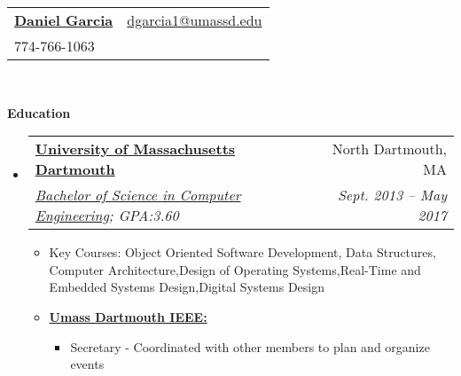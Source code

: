 \documentclass[letterpaper,11pt]{article}
\makeatletter
\newcommand{\resitem}[1]{\item #1 \vspace{-2pt}}
\newcommand{\resheading}[1]{{\large \colorbox{mygrey}{\begin{minipage}{\textwidth}{\textbf{#1 \vphantom{p\^{E}}}}\end{minipage}}}}
\newcommand{\ressubheading}[4]{
\begin{tabular*}{6.5in}{l@{\extracolsep{\fill}}r}
		\textbf{#1} & #2 \\
		\textit{#3} & \textit{#4} \\
\end{tabular*}\vspace{-6pt}}
\makeatother
\begin{document}
\newcommand{\mywebheader}{
\begin{tabular*}{7in}{l@{\extracolsep{\fill}}r}
	\textbf{\href{http://www.DanGarcia.me/}{\LARGE Daniel Garcia}} & \href{mailto:dgarcia1@umassd.edu}{dgarcia1@umassd.edu}\\
    {774-766-1063}
	\end{tabular*}
\\
\vspace{0.1in}}

\mywebheader

\resheading{Education}
	\begin{itemize}
		\item
			\ressubheading{\href{http://www.umassd.edu}{University of Massachusetts Dartmouth}}{North Dartmouth, MA}{\href{http://www.umassd.edu/engineering/ece/}{Bachelor of Science in Computer Engineering}; {GPA:3.60}}{Sept. 2013 -- May 2017}
				{ \footnotesize
				\begin{itemize}
					\resitem{Key Courses: Object Oriented Software Development, Data Structures, {Computer Architecture},{Design of Operating Systems},{Real-Time and Embedded Systems Design},{Digital Systems Design}}
					\resitem{\textbf{\href{http://www1.umassd.edu/engineering/clubs/ieee/welcome.cfm}{Umass Dartmouth IEEE:}}} 
						\begin{itemize}
							\resitem{Secretary - Coordinated with other members to plan and organize events}
						\end{itemize}
				\end{itemize}
				}
\begin{comment}
		\item
			\ressubheading{\href{http://bcc.billings.k12.mt.us/}{Billings Career Center}}{Billings, MT}{\href{http://www.cisco.com/web/learning/netacad/index.html}{Cisco Networking Academy}; GPA:3.33}{Aug. 2002 - May 2003}
				{ \footnotesize
				\begin{itemize}
				\resitem{Graduated \href{http://www.cisco.com/web/learning/netacad/index.html}{Cisco Semester Four} comprising of coursework in networking infrastructures including LAN and WAN design and implementation}
				\end{itemize}
				}
\end{comment}
	\end{itemize} %
\end{document}
